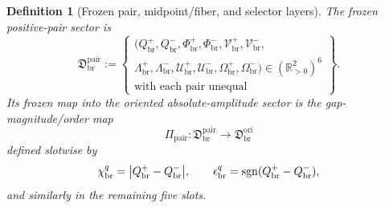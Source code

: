 \documentclass[11pt]{article}
\newcommand{\OriginSector}{\mathfrak D_{\mathrm{br}}^{\mathrm{ori}}}
\newcommand{\AbsReadAmp}{\chi_{\mathrm{br}}^{q}}
\newcommand{\PolRead}{\epsilon_{\mathrm{br}}^{q}}
\newcommand{\PairSector}{\mathfrak D_{\mathrm{br}}^{\mathrm{pair}}}
\newcommand{\PairMap}{\Pi_{\mathrm{pair}}}
\newcommand{\PairReadPlus}{Q_{\mathrm{br}}^{+}}
\newcommand{\PairReadMinus}{Q_{\mathrm{br}}^{-}}
\newcommand{\PairCovPlus}{\Phi_{\mathrm{br}}^{+}}
\newcommand{\PairCovMinus}{\Phi_{\mathrm{br}}^{-}}
\newcommand{\PairRelaxPlus}{\mathcal V_{\mathrm{br}}^{+}}
\newcommand{\PairRelaxMinus}{\mathcal V_{\mathrm{br}}^{-}}
\newcommand{\PairWellPlus}{\Lambda_{\mathrm{br}}^{+}}
\newcommand{\PairWellMinus}{\Lambda_{\mathrm{br}}^{-}}
\newcommand{\PairEqPlus}{\mathcal U_{\mathrm{br}}^{+}}
\newcommand{\PairEqMinus}{\mathcal U_{\mathrm{br}}^{-}}
\newcommand{\PairScalePlus}{\Omega_{\mathrm{br}}^{+}}
\newcommand{\PairScaleMinus}{\Omega_{\mathrm{br}}^{-}}
\newtheorem{definition}{Definition}
\begin{document}
\begin{definition}[Frozen pair, midpoint/fiber, and selector layers]
\label{def:frozenlayers}
The frozen positive-pair sector is
\begin{equation}
\PairSector
:=
\left\{
\begin{array}{l}
(\PairReadPlus,\PairReadMinus,\PairCovPlus,\PairCovMinus,\PairRelaxPlus,\PairRelaxMinus,\\
\PairWellPlus,\PairWellMinus,\PairEqPlus,\PairEqMinus,\PairScalePlus,\PairScaleMinus)
\in(\mathbb R_{>0}^{2})^{6}
\\[0.3em]
\text{with each pair unequal}
\end{array}
\right\}.
\label{eq:pairsector}
\end{equation}
Its frozen map into the oriented absolute-amplitude sector is the gap-magnitude/order map
\begin{equation}
\PairMap:\PairSector\longrightarrow\OriginSector
\label{eq:pairmap}
\end{equation}
defined slotwise by
\begin{equation}
\AbsReadAmp=\abs{\PairReadPlus-\PairReadMinus},
\qquad
\PolRead=\operatorname{sgn}(\PairReadPlus-\PairReadMinus),
\label{eq:pairread}
\end{equation}
and similarly in the remaining five slots.


\end{definition}
\end{document}
